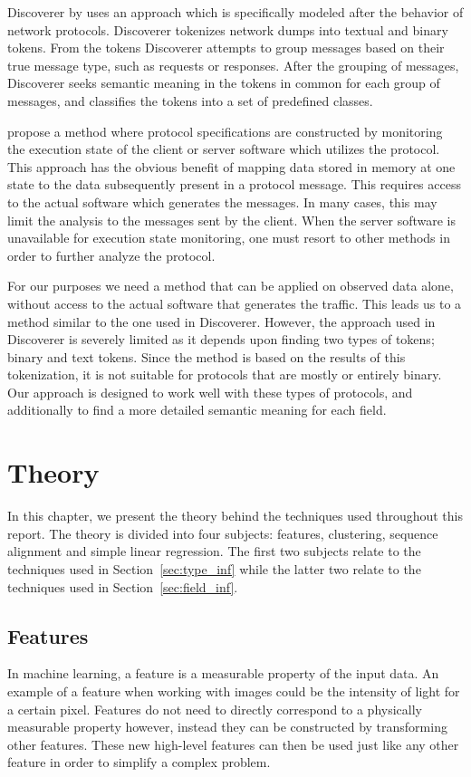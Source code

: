 \documentclass[a4paper]{report}
\begin{document}
Discoverer by \citet{cui07} uses an approach which is specifically modeled
after the behavior of network protocols. Discoverer tokenizes
network dumps into textual and binary tokens. From the tokens Discoverer
attempts to group messages based on their true message type, such as requests
or responses. After the grouping of messages, Discoverer seeks semantic meaning
in the tokens in common for each group of messages, and classifies the tokens
into a set of predefined classes.

\citet{caballero12} propose a method where protocol specifications are
constructed by monitoring the execution state of the client or server software
which utilizes the protocol. This approach has the obvious benefit of mapping
data stored in memory at one state to the data subsequently present in a
protocol message. This requires access to the actual software which generates
the messages. In many cases, this may limit the analysis to the messages sent by
the client. When the server software is unavailable for execution state
monitoring, one must resort to other methods in order to further analyze the
protocol.

For our purposes we need a method that can be applied on observed data alone,
without access to the actual software that generates the traffic. This leads us
to a method similar to the one used in Discoverer. However, the approach used
in Discoverer is severely limited as it depends upon finding two types of
tokens; binary and text tokens. Since the method is based on the results of
this tokenization, it is not suitable for protocols that are mostly or entirely
binary. Our approach is designed to work well with these types of protocols,
and additionally to find a more detailed semantic meaning for each field.

\chapter{Theory}
In this chapter, we present the theory behind the techniques used throughout
this report. The theory is divided into four subjects: features, clustering,
sequence alignment and simple linear regression. The first two subjects relate
to the techniques used in Section~\ref{sec:type_inf} while the latter two
relate to the techniques used in Section~\ref{sec:field_inf}.

\section{Features}
In machine learning, a feature is a measurable property of the input data. An
example of a feature when working with images could be the intensity of light
for a certain pixel. Features do not need to directly correspond to a
physically measurable property however, instead they can be constructed by
transforming other features. These new high-level features can then be used
just like any other feature in order to simplify a complex problem.
\end{document}
